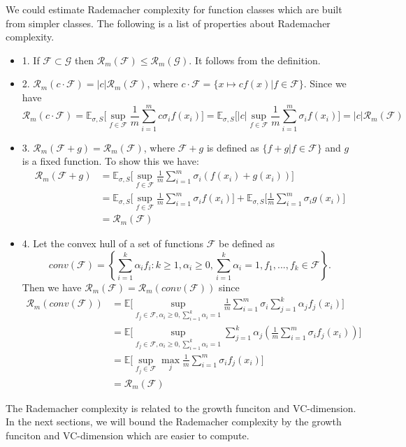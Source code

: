 We could estimate Rademacher complexity for function classes which are built from simpler classes. The following is a list of properties about Rademacher complexity.
\begin{itemize}
	\item 1. If $\mathcal{F}\subset \mathcal{G}$ then $\mathcal{R}_m(\mathcal{F}) \leq \mathcal{R}_m(\mathcal{G})$. It follows from the definition.
	\item 2. $\mathcal{R}_m(c\cdot \mathcal{F}) = |c|\mathcal{R}_m(\mathcal{F})$, where $c\cdot \mathcal{F}=\{x\mapsto cf(x) | f\in \mathcal{F}\}$. Since we have 
	\begin{equation}
	\mathcal{R}_m(c\cdot \mathcal{F})= \mathbb{E}_{\sigma,S}\bigg[\sup_{f\in \mathcal{F}}\frac{1}{m}\sum_{i=1}^{m}c\sigma_i f(x_i)\bigg] = \mathbb{E}_{\sigma,S}\bigg[|c|\sup_{f\in \mathcal{F}}\frac{1}{m}\sum_{i=1}^{m}\sigma_i f(x_i)\bigg] = |c|\mathcal{R}_m(\mathcal{F})
	\end{equation}
	\item 3. $\mathcal{R}_m(\mathcal{F}+g) = \mathcal{R}_m(\mathcal{F})$, where $\mathcal{F}+g$ is defined as $\{f+g| f\in \mathcal{F}\}$ and $g$ is a fixed function. To show this we have:
	\begin{align}
	\mathcal{R}_m(\mathcal{F}+g) &= \mathbb{E}_{\sigma,S}\bigg[\sup_{f\in \mathcal{F}}\frac{1}{m}\sum_{i=1}^{m}\sigma_i (f(x_i)+g(x_i))\bigg]\\
	&= \mathbb{E}_{\sigma,S}\bigg[\sup_{f\in \mathcal{F}}\frac{1}{m}\sum_{i=1}^{m}\sigma_i f(x_i)\bigg] + \mathbb{E}_{\sigma,S}\bigg[\frac{1}{m}\sum_{i=1}^{m}\sigma_i g(x_i)\bigg]\\
	&=\mathcal{R}_m(\mathcal{F})
	\end{align}
	\item 4. Let the convex hull of a set of functions $\mathcal{F}$ be defined as
	\begin{equation}
	conv(\mathcal{F}) = \left\{ \sum_{i=1}^{k}\alpha_if_i : k\geq 1,\alpha_i\geq 0, \sum_{i=1}^{k}\alpha_i=1, f_1,...,f_k\in \mathcal{F} \right\}.
	\end{equation}
	Then we have $\mathcal{R}_m(\mathcal{F})= \mathcal{R}_m(conv(\mathcal{F}))$ since
	\begin{align}
	\mathcal{R}_m(conv(\mathcal{F})) &= \mathbb{E}\bigg[ \sup_{f_j\in \mathcal{F}, \alpha_i\geq 0, \sum_{i=1}^{k}\alpha_i=1} \frac{1}{m} \sum_{i=1}^{m}\sigma_i \sum_{j=1}^{k} \alpha_jf_j(x_i) \bigg]\\
	&= \mathbb{E}\bigg[ \sup_{f_j\in \mathcal{F}, \alpha_i\geq 0, \sum_{i=1}^{k}\alpha_i=1}\sum_{j=1}^{k}\alpha_j \left( \frac{1}{m} \sum_{i=1}^{m}\sigma_i  f_j(x_i) \right) \bigg]\\
	&= \mathbb{E}\bigg[ \sup_{f_j\in \mathcal{F}}\max_{j} \frac{1}{m}\sum_{i=1}^{m}\sigma_if_j(x_i) \bigg]\\
	&= \mathcal{R}_m(\mathcal{F})
	\end{align}
\end{itemize}
The Rademacher complexity is related to the growth funciton and VC-dimension. In the next sections, we will bound the Rademacher complexity by the growth funciton and VC-dimension which are easier to compute.
